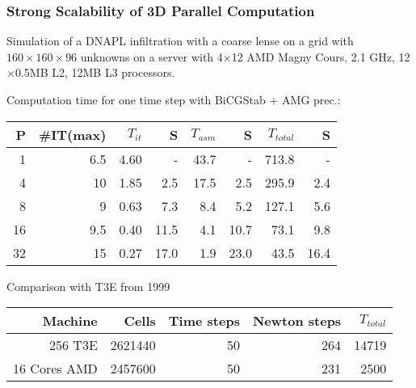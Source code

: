 \begin{frame}
\frametitle<presentation>{Strong Scalability of 3D Parallel Computation}
Simulation of a DNAPL infiltration with a coarse lense on a grid with  $160 \times 160 \times 96$
unknowns on a server with 4$\times$12  AMD Magny Cours, 2.1 GHz, 12$\times$0.5MB L2, 12MB
L3 processors.

Computation time for one time step with BiCGStab + AMG prec.:

\begin{center}
\begin{tabular}{r|rrr|rr|rr}
\hline
P  & \#IT(max) & $T_{it}$ & S & $T_{asm}$ & S & $T_{total}$ & S \\
\hline
 1  &  6.5 & 4.60 &      - &  43.7 &      - & 713.8 &    - \\
 4  &  10  & 1.85 &   2.5 &  17.5 &   2.5 & 295.9 & 2.4 \\
 8  &  9    & 0.63 &   7.3 &    8.4 &   5.2 & 127.1 & 5.6 \\
16 &  9.5 & 0.40 & 11.5 &    4.1 & 10.7 &   73.1 & 9.8 \\
32 &  15  & 0.27 & 17.0 &    1.9 & 23.0 &   43.5 & 16.4 \\
\hline
\end{tabular}
\end{center}

Comparison with T3E from 1999

\begin{center}
\begin{tabular}{r|rrrr}
\hline
Machine  & Cells & Time steps & Newton steps & $T_{total}$ \\
\hline
256 T3E        & 2621440 &  50 & 264 & 14719\\
16 Cores AMD & 2457600 & 50 & 231 & 2500\\
\hline
\end{tabular}
\end{center}
\end{frame}


